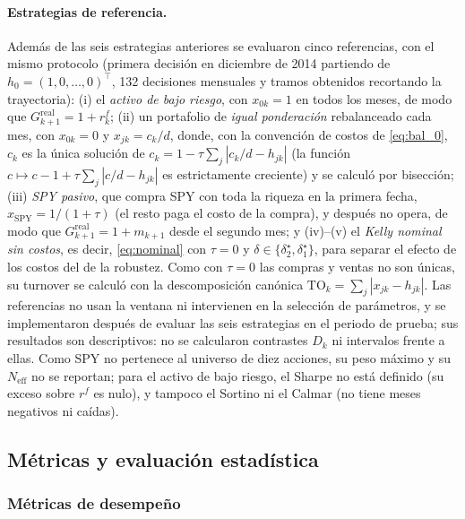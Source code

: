 \paragraph{Estrategias de referencia.}\label{sec:referencias} Además de las seis estrategias anteriores se evaluaron cinco referencias, con el mismo protocolo (primera decisión en diciembre de 2014 partiendo de $h_0=(1,0,\dots,0)^\top$, 132 decisiones mensuales y tramos obtenidos recortando la trayectoria): (i) el \emph{activo de bajo riesgo}, con $x_{0k}=1$ en todos los meses, de modo que $G^{\mathrm{real}}_{k+1}=1+r^f_k$; (ii) un portafolio de \emph{igual ponderación} rebalanceado cada mes, con $x_{0k}=0$ y $x_{jk}=c_k/d$, donde, con la convención de costos de \eqref{eq:bal_0}, $c_k$ es la única solución de $c_k=1-\tau\sum_{j}|c_k/d-h_{jk}|$ (la función $c\mapsto c-1+\tau\sum_j|c/d-h_{jk}|$ es estrictamente creciente) y se calculó por bisección; (iii) \emph{SPY pasivo}, que compra SPY con toda la riqueza en la primera fecha, $x_{\mathrm{SPY}}=1/(1+\tau)$ (el resto paga el costo de la compra), y después no opera, de modo que $G^{\mathrm{real}}_{k+1}=1+m_{k+1}$ desde el segundo mes; y (iv)--(v) el \emph{Kelly nominal sin costos}, es decir, \eqref{eq:nominal} con $\tau=0$ y $\delta\in\{\delta_2^\star,\delta_1^\star\}$, para separar el efecto de los costos del de la robustez. Como con $\tau=0$ las compras y ventas no son únicas, su turnover se calculó con la descomposición canónica $\mathrm{TO}_k=\sum_j|x_{jk}-h_{jk}|$. Las referencias no usan la ventana ni intervienen en la selección de parámetros, y se implementaron después de evaluar las seis estrategias en el periodo de prueba; sus resultados son descriptivos: no se calcularon contrastes $D_k$ ni intervalos frente a ellas. Como SPY no pertenece al universo de diez acciones, su peso máximo y su $N_{\mathrm{eff}}$ no se reportan; para el activo de bajo riesgo, el Sharpe no está definido (su exceso sobre $r^f$ es nulo), y tampoco el Sortino ni el Calmar (no tiene meses negativos ni caídas).

\subsection{Métricas y evaluación estadística}\label{sec:metricas}

\subsubsection{Métricas de desempeño}

